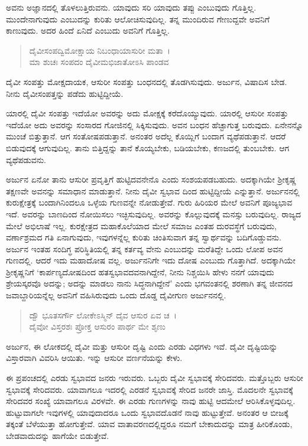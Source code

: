 ಅವನು ಅಜ್ಞಾನದಲ್ಲಿ ತೊಳಲುತ್ತಿರುವನು. ಯಾವುದು ಸರಿ ಯಾವುದು ತಪ್ಪು ಎಂಬುವುದು ಗೊತ್ತಿಲ್ಲ. ಮುಂದೇನಾಗುವುದು ಎಂಬುದನ್ನು ಕುರಿತು ಆಲೋಚಿಸುವುದಿಲ್ಲ. ತನ್ನ ಮುಂದಿರುವ ಗೇಣುದ್ದವೇ ಅವನಿಗೆ ಕಾಣುವುದು. ಅದರ ಹಿಂದೆ ಏನಿದೆ ಎಂಬುದು ಅವನಿಗೆ ಗೊತ್ತಿಲ್ಲ.

\begin{verse}
ದೈವೀಸಂಪದ್ವಿಮೋಕ್ಷಾಯ ನಿಬಂಧಾಯಾಸುರೀ ಮತಾ~।\\ಮಾ ಶುಚಃ ಸಂಪದಂ ದೈವೀಮಭಿಜಾತೋಽಸಿ ಪಾಂಡವ 
\end{verse}

{\small ದೈವೀ ಸಂಪತ್ತು ಮೋಕ್ಷದಾಯಕ, ಆಸುರೀ ಸಂಪತ್ತು ಬಂಧನದಲ್ಲಿ ತೊಡಗಿಸುವುದು. ಅರ್ಜುನ, ವಿಷಾದಿಸ ಬೇಡ. ನೀನು ದೈವೀಸಂಪತ್ತನ್ನು ಪಡೆದು ಹುಟ್ಟಿದ್ದೀಯೆ.}

ಯಾರಲ್ಲಿ ದೈವೀ ಸಂಪತ್ತು ಇದೆಯೋ ಅವರನ್ನು ಅದು ಮೋಕ್ಷಕ್ಕೆ ಕರೆದೊಯ್ಯುವುದು. ಯಾರಲ್ಲಿ ಆಸುರೀ ಸಂಪತ್ತು ಇದೆಯೋ ಅದು ಅವರನ್ನು ಸಂಸಾರದ ಗೋಜಿನಲ್ಲಿ ಸಿಕ್ಕಿಸುವುದು. ಅವನ ಬಂಧನ ಹೆಚ್ಟಾಗುತ್ತ ಬರುವುದು. ಏನೇನನ್ನೊ ಮುಂಚೆ ಬಿತ್ತುತ್ತಾನೆ. ಆಗ ಸಂತೋಷಪಡುತ್ತಾನೆ. ಅನಂತರ ಅದೆಲ್ಲ ಕೊಯ್ಲಿಗೆ ಬಂದಾಗ ವ್ಯಥೆಪಡುತ್ತಾನೆ. ಆದರೆ ಬಿಡುವುದಕ್ಕೆ ಆಗುವುದಿಲ್ಲ. ತಾನು ಬಿತ್ತಿದ್ದನ್ನು ತಾನೆ ಕೊಯ್ಯಬೇಕು, ಬಡಿಯಬೇಕು, ಕಣಜದಲ್ಲಿ ತುಂಬಬೇಕು. ಆಗ ವ್ಯಥೆಪಡುವನು.

ಅರ್ಜುನ ಏನೋ ತಾನು ಆಸುರೀ ಪ್ರವೃತ್ತಿಗೆ ಹುಟ್ಟಿದವನೇನೊ ಎಂದು ಸಂಶಯಪಡಬಹುದು. ಅದಕ್ಕಾಗಿಯೇ ಶ‍್ರೀಕೃಷ್ಣ ತಕ್ಷಣವೇ ಅವನನ್ನು ಸಮಾಧಾನ ಮಾಡುತ್ತಾನೆ. ನೀನು ದೈವೀ ಸ್ವಭಾವ ದಿಂದ ಹುಟ್ಟಿದ್ದೀಯೆ ಎನ್ನುತ್ತಾನೆ. ಅರ್ಜುನನಲ್ಲಿ ಕುರುಕ್ಷೇತ್ರಕ್ಕೆ ಬಂದಾಗಿನಿಂದಲೂ ಒಳ್ಳೆಯ ಗುಣವನ್ನೇ ನೋಡುತ್ತೇವೆ. ಗುರು ಹಿರಿಯರ ಮೇಲೆ ಅವನಿಗೆ ಪೂಜ್ಯಭಾವ ಇದೆ. ಅವರನ್ನು ಬಾಣದಿಂದ ನೋಯಿಸಲು ಇಚ್ಛಿಸುವುದಿಲ್ಲ. ಅವರನ್ನು ಕೊಲ್ಲುವುದಕ್ಕೆ ಮನಸ್ಸು ಬರುವುದಿಲ್ಲ. ರಾಜ್ಯದ ಮೇಲೆ ಅಭಿಲಾಷೆ ಇಲ್ಲ. ಕುರಕ್ಷೇತ್ರದ ಮಹಾಕೊಲೆಯಾದ ಮೇಲೆ ಸಮಾಜ ಎಂತಹ ದುರವಸ್ಥೆಗೆ ಬರುವುದು, ವರ್ಣಾಶ್ರಮದ ಗತಿ ಏನಾಗುವುದು, ಇವುಗಳನ್ನೆಲ್ಲ ಕುರಿತು ಚಿಂತಿಸುವಾಗ ತನ್ನ ಸ್ವಾರ್ಥವನ್ನು ಬದಿಗೊಡ್ಡುವನು. ಅರ್ಜುನ ಇಂತಹ ಸಂದಿಗ್ಧ ಪರಿಸ್ಥಿತಿಯಲ್ಲಿ ತನ್ನ ಕರ್ತವ್ಯ ವೇನು ಎಂಬುದನ್ನು ಮರೆತಿದ್ದೇ ಒಂದು ಲೋಪ ಅವನ ಗುಣದಲ್ಲಿ. ಆದರೆ ಇದು ಮಹಾದೋಷ ವಲ್ಲ. ಅರ್ಜುನನಿಗೇ ಇದು ದೋಷ ಎಂಬುದು ಗೊತ್ತಾಗಿದೆ. ಅದಕ್ಕಾಗಿಯೇ ಶ‍್ರೀಕೃಷ್ಣನಿಗೆ ‘ಕಾರ್ಪಣ್ಯದೋಷದಿಂದ ಹತಸ್ವಭಾವದವನಾಗಿದ್ದೇನೆ, ನೀನು ನಿಶ್ಚಯಿಸಿ ಹೇಳು ನನಗೆ ಯಾವುದು ಶ್ರೇಯಸ್ಕರವೊ ಅದನ್ನು; ಅದನ್ನು ಮಾಡಲು ನಾನು ಸಿದ್ಧನಾಗಿದ್ದೇನೆ’ ಎಂದು ಭಗವಂತನಲ್ಲಿ ಶರಣಾಗಿ ತನ್ನ ಜೀವನದ ಜವಾಬ್ದಾರಿಯನ್ನೆಲ್ಲ ಅವನಿಗೆ ವಹಿಸಿರುವುದು ಒಂದು ದೊಡ್ಡ ದೈವೀಗುಣ ಅರ್ಜುನನಲ್ಲಿ.

\begin{verse}
ದ್ವೌ ಭೂತಸರ್ಗೌ ಲೋಕೇಽಸ್ಮಿನ್ ದೈವ ಆಸುರ ಏವ ಚ~।\\ದೈವೋ ವಿಸ್ತರಶಃ ಪ್ರೋಕ್ತ ಆಸುರಂ ಪಾರ್ಥ ಮೇ ಶೃಣು 
\end{verse}

{\small ಅರ್ಜುನ, ಈ ಲೋಕದಲ್ಲಿ ದೈವೀ ಮತ್ತು ಆಸುರೀ ದೃಷ್ಟಿ ಎಂದು ಎರಡು ವಿಧಗಳು ಇವೆ. ದೈವೀ ದೃಷ್ಟಿಯನ್ನು ವಿಸ್ತಾರವಾಗಿ ವಿವರಿಸಿ ಆಯಿತು. ಇನ್ನು ಆಸುರೀ ವರ್ಣನೆಯನ್ನು ಕೇಳು.}

ಈ ಪ್ರಪಂಚದಲ್ಲಿ ಎರಡು ಸ್ವಭಾವದ ಜನರು ಇರುವರು. ಒಬ್ಬರು ದೈವೀ ಸ್ವಭಾವಕ್ಕೆ ಸೇರಿದವರು. ಮತ್ತೊಬ್ಬರು ಆಸುರೀ ಸ್ವಭಾವಕ್ಕೆ ಸೇರಿದವರು. ಯಾವಾಗಲೂ ಇದರಲ್ಲಿ ಎರಡನೆ ಸ್ವಭಾವಕ್ಕೆ ಸೇರಿದ ಜನರೇ ಜಾಸ್ತಿ. ಮೊದಲನೇ ಸ್ವಭಾವಕ್ಕೆ ಸೇರಿದವರ ಸಂಖ್ಯೆ ಯಾವಾಗಲೂ ವಿರಳವೇ. ಈ ಎರಡು ಗುಣಗಳನ್ನು ನಾವು ಹುಟ್ಟಿ ಆದಮೇಲೆ ಆರಿಸಿಕೊಳ್ಳವುದಿಲ್ಲ. ಹುಟ್ಟುವಾಗಲೇ ಇವುಗಳಲ್ಲಿ ಯಾವುದಾದರೂ ಒಂದು ಸ್ವಭಾವದೊಡನೆ ನಾವು ಹುಟ್ಟುತ್ತೇವೆ. ಅನಂತರ ಆ ಬೀಜಕ್ಕೆ ತಕ್ಕಂತೆ ಬೆಳೆಯುತ್ತಾ ಹೋಗುತ್ತೇವೆ. ಯಾವ ವಾತಾವರಣದಲ್ಲಿದ್ದರೂ ನಮಗೆ ಬೇಕಾದುದನ್ನು ಮಾತ್ರ ಹೀರಿಕೊಂಡು, ಬೇಡವಾದುದನ್ನು ಹಾಗೆಯೇ ಬಿಡುತ್ತೇವೆ.

